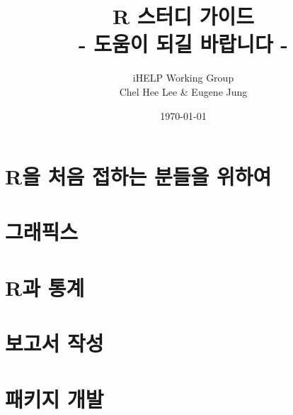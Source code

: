 \documentclass{book}
\title{R 스터디 가이드 \\
   - 도움이 되길 바랍니다 - 
   }
\author{iHELP Working Group \\ Chel Hee Lee \& Eugene Jung }
\date{\today}
\begin{document}
\maketitle
\tableofcontents 

\part{R을 처음 접하는 분들을 위하여}
% 


\part{그래픽스}
% 
% 

\part{R과 통계}
% 
% 


\part{보고서 작성}
% 
% 

\part{패키지 개발}
% 
% 

\nocite{GNUR}
\nocite{GNUR-FAQ}



\end{document}
